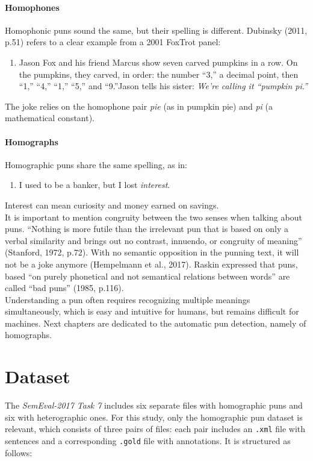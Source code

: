 \documentclass[10pt]{article}
\begin{document}
\paragraph{Homophones} Homophonic puns sound the same, but their spelling is different. 
Dubinsky (2011, p.51) refers to a clear example from a 2001 FoxTrot panel:
\begin{enumerate}
    \item Jason Fox and his friend Marcus show seven carved pumpkins in a row.  On the pumpkins, they carved, in order: the number “3,” a decimal point, then “1,” “4,” “1,” “5,” and “9.”Jason tells his sister: \textit{We’re calling it “pumpkin pi.”}
\end{enumerate}
 
The joke relies on the homophone pair \textit{pie} (as in pumpkin pie) and \textit{pi} (a mathematical constant). 

\paragraph{Homographs} Homographic puns share the same spelling, as in:

\begin{enumerate}
    \item I used to be a banker, but I lost \textit{interest}.
\end{enumerate}
Interest can mean curiosity and money earned on savings.\\[15pt]
It is important to mention congruity between the two senses when talking about puns. “Nothing is more futile than the irrelevant pun that is based on only a verbal similarity and brings out no contrast, innuendo, or congruity of meaning” (Stanford, 1972, p.72). With no semantic opposition in the punning text, it will not be a joke anymore (Hempelmann et al., 2017). Raskin expressed that puns, based “on purely phonetical and not semantical relations between words” are called “bad puns” (1985, p.116). \\[6pt]
Understanding a pun often requires recognizing multiple meanings simultaneously, which is easy and intuitive for humans, but remains difficult for machines. Next chapters are dedicated to the automatic pun detection, namely of homographs. 

\section{Dataset}
The \textit{SemEval-2017 Task 7} includes six separate files with homographic puns and six with heterographic ones. For this study, only the homographic pun dataset is relevant, which consists of three pairs of files: each pair includes an  \texttt{.xml} file with sentences and a corresponding \texttt{.gold} file with annotations. It is structured as follows:\\[6pt]
\end{document}
